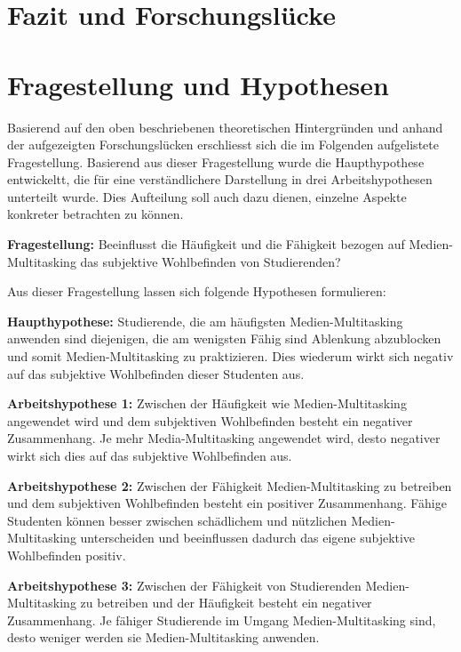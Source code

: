 \section{Fazit und Forschungslücke}\label{section.fazitLücke}

\section{Fragestellung und Hypothesen}\label{section.fragestellung}
Basierend auf den oben beschriebenen theoretischen Hintergründen und anhand der aufgezeigten Forschungslücken erschliesst sich die im Folgenden aufgelistete Fragestellung. Basierend aus dieser Fragestellung wurde die Haupthypothese entwickeltt, die für eine verständlichere Darstellung in drei Arbeitshypothesen unterteilt wurde. Dies Aufteilung soll auch dazu dienen, einzelne Aspekte konkreter betrachten zu können. \par
\textbf{Fragestellung:} Beeinflusst die Häufigkeit und die Fähigkeit bezogen auf Medien-Multitasking das subjektive Wohlbefinden von Studierenden?\par
Aus dieser Fragestellung lassen sich folgende Hypothesen formulieren:\par
\textbf{Haupthypothese:}
Studierende, die am häufigsten Medien-Multitasking anwenden sind diejenigen, die am wenigsten Fähig sind Ablenkung abzublocken und somit Medien-Multitasking zu praktizieren. Dies wiederum wirkt sich negativ auf das subjektive Wohlbefinden dieser Studenten aus.\par
\textbf{Arbeitshypothese 1:} Zwischen der Häufigkeit wie Medien-Multitasking angewendet wird und dem subjektiven Wohlbefinden besteht ein negativer Zusammenhang. Je mehr Media-Multitasking angewendet wird, desto negativer wirkt sich dies auf das subjektive Wohlbefinden aus.\par
\textbf{Arbeitshypothese 2:} Zwischen der Fähigkeit Medien-Multitasking zu betreiben und dem subjektiven Wohlbefinden besteht ein positiver Zusammenhang. Fähige Studenten können besser zwischen schädlichem und nützlichen Medien-Multitasking unterscheiden und beeinflussen dadurch das eigene subjektive Wohlbefinden positiv.\par
\textbf{Arbeitshypothese 3:} Zwischen der Fähigkeit von Studierenden Medien-Multitasking zu betreiben und der Häufigkeit besteht ein negativer Zusammenhang. Je fähiger Studierende im Umgang Medien-Multitasking sind, desto weniger werden sie Medien-Multitasking anwenden.





